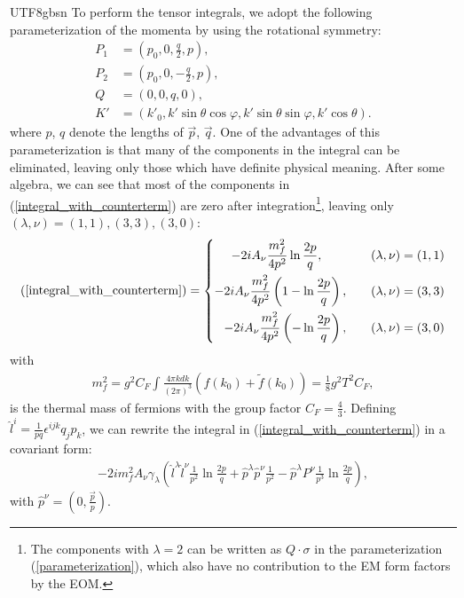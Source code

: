 \documentclass[11pt]{article}\def\baselinestretch{1.4}
\def\p{{\pi}}
\begin{document}
\begin{CJK}{UTF8}{gbsn}
To perform the tensor integrals, we adopt the following parameterization of the momenta by using the rotational symmetry:
\begin{align}
   P_1 &=(p_0, 0, \frac{q}{2}, p) ,\nonumber \\
   P_2 &=(p_0, 0, -\frac{q}{2}, p) ,\nonumber \\
   Q &=(0, 0, q, 0) ,\nonumber \\
   K' &=(k'_0, k' \sin{\theta } \cos{\varphi }, k' \sin{\theta } \sin{\varphi }, k' \cos{\theta }).\label{parameterization}
\end{align}
where $p$, $q$ denote the lengths of $\vec{p}$, $\vec{q}$. One of the advantages of this parameterization is that many of the components in the integral can be eliminated, leaving only those which have definite physical meaning.
After some algebra, we can see that most of the components in (\ref{integral_with_counterterm}) are zero after integration\footnote{The components with $\lambda = 2$ can be written as $Q\cdot \sigma$ in the parameterization (\ref{parameterization}), which also have no contribution to the EM form factors by the EOM.  }, leaving only $(\lambda, \nu)=(1, 1), (3, 3), (3, 0)$: 
\begin{align}
(\ref{integral_with_counterterm}) = \left\{
\begin{aligned}
-2i A_\nu \frac{m_f^2}{4p^2}\ln{\frac{2p}{q}}, \quad\quad\quad\quad   & (\lambda,\nu)=(1,1)  \\
-2i A_\nu \frac{m_f^2}{4p^2}\left(1-\ln{\frac{2p}{q}}\right), \quad\quad   & (\lambda,\nu)=(3,3)  \\
-2i A_\nu \frac{m_f^2}{4p^2}\left(-\ln{\frac{2p}{q}}\right), \quad\quad   & (\lambda,\nu)=(3,0)
\end{aligned}
\right.
\end{align}
with
\begin{align}
m_f^2=g^2C_F\int\frac{4\p kdk}{(2\pi)^3}\left(f(k_0)+\tilde{f}(k_0)\right)=\frac{1}{8}g^2 T^2 C_F,
\end{align}
is the thermal mass of fermions with the group factor $C_F=\frac{4}{3}$.
Defining $\hat{l}^i=\frac{1}{pq}\epsilon^{ijk}q_j p_k$, we can rewrite the integral in (\ref{integral_with_counterterm}) in a covariant form:
\begin{align}
-2i m_f^2 A_\nu \gamma _\lambda \left( \hat{l}^\lambda \hat{l}^\nu \frac{1}{p^2}\ln{\frac{2p}{q}} + \hat{p}^\lambda \hat{p}^\nu \frac{1}{p^2} - \hat{p}^\lambda P^\nu \frac{1}{p^3}\ln{\frac{2p}{q}} \right), \label{vertex_without_thermal_mass}
\end{align}
with $\hat{p}^\nu = (0,\frac{\vec{p}}{p})$.%
 

\end{CJK}
\end{document}

